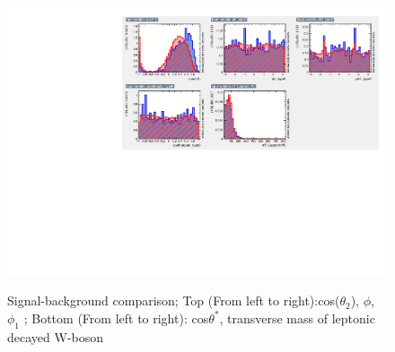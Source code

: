 \begin{figure}[h!]\ContinuedFloat
	 {\includegraphics[scale=0.85]{Plots/BDT_Performance/Trial1/dataset/plots/canvas5.pdf}}
	 \caption{Signal-background comparison; Top (From left to right):cos($\theta_2$), $\phi$, $\phi_1$  ; Bottom (From left to right): cos$\theta^{\ast}$, transverse mass of leptonic decayed W-boson}
\end{figure}

\clearpage
